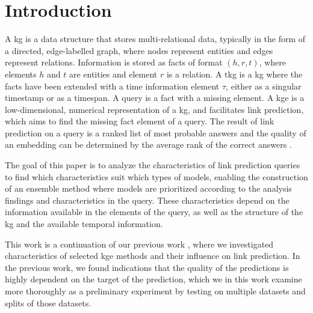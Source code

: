 \section{Introduction}
\label{sec:introduction}

A \gls{kg} is a data structure that stores multi-relational data, typically in the form of a directed, edge-labelled graph, where nodes represent entities and edges represent relations.
Information is stored as facts of format $(h,r,t)$, where elements $h$ and $t$ are entities and element $r$ is a relation.
A \gls{tkg} is a \gls{kg} where the facts have been extended with a time information element $\tau$, either as a singular timestamp or as a timespan.
A query is a fact with a missing element.
A \gls{kge} is a low-dimensional, numerical representation of a \gls{kg}, and facilitates link prediction, which aims to find the missing fact element of a query.
The result of link prediction on a query is a ranked list of most probable answers and the quality of an embedding can be determined by the average rank of the correct answers \cite{knowledge_graphs_survey}.

The goal of this paper is to analyze the characteristics of link prediction queries to find which characteristics suit which types of models, enabling the construction of an ensemble method where models are prioritized according to the analysis findings and characteristics in the query.
These characteristics depend on the information available in the elements of the query, as well as the structure of the \gls{kg} and the available temporal information. 

This work is a continuation of our previous work \cite{P9}, where we investigated characteristics of selected \gls{kge} methods and their influence on link prediction.
In the previous work, we found indications that the quality of the predictions is highly dependent on the target of the prediction, which we in this work examine more thoroughly as a preliminary experiment by testing on multiple datasets and splits of those datasets.

